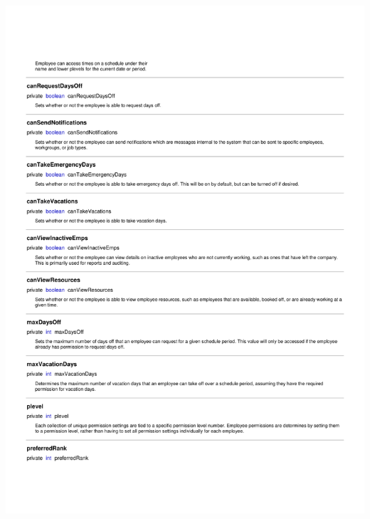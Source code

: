 \documentclass[letterpaper,12pt]{report}
\begin{document}
\includegraphics[scale=0.9,trim=20mm 30mm 25mm 25mm]{externals/ProblemDomainDataDictionary9.pdf}
\newpage
\end{document}
